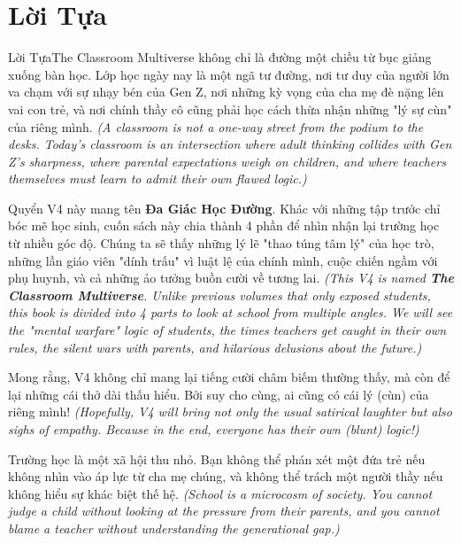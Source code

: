 \chapter*{Lời Tựa}

\begin{truyen}{Lời Tựa}{The Classroom Multiverse}
 không chỉ là đường một chiều từ bục giảng xuống bàn học. Lớp học ngày nay là một ngã tư đường, nơi tư duy của người lớn va chạm với sự nhạy bén của Gen Z, nơi những kỳ vọng của cha mẹ đè nặng lên vai con trẻ, và nơi chính thầy cô cũng phải học cách thừa nhận những "lý sự cùn" của riêng mình. 
\textit{(A classroom is not a one-way street from the podium to the desks. Today's classroom is an intersection where adult thinking collides with Gen Z's sharpness, where parental expectations weigh on children, and where teachers themselves must learn to admit their own flawed logic.)}

Quyển V4 này mang tên \textbf{Đa Giác Học Đường}. Khác với những tập trước chỉ bóc mẽ học sinh, cuốn sách này chia thành 4 phần để nhìn nhận lại trường học từ nhiều góc độ. Chúng ta sẽ thấy những lý lẽ "thao túng tâm lý" của học trò, những lần giáo viên "dính trấu" vì luật lệ của chính mình, cuộc chiến ngầm với phụ huynh, và cả những ảo tưởng buồn cười về tương lai.
\textit{(This V4 is named \textbf{The Classroom Multiverse}. Unlike previous volumes that only exposed students, this book is divided into 4 parts to look at school from multiple angles. We will see the "mental warfare" logic of students, the times teachers get caught in their own rules, the silent wars with parents, and hilarious delusions about the future.)}

Mong rằng, V4 không chỉ mang lại tiếng cười châm biếm thường thấy, mà còn để lại những cái thở dài thấu hiểu. Bởi suy cho cùng, ai cũng có cái lý (cùn) của riêng mình!
\textit{(Hopefully, V4 will bring not only the usual satirical laughter but also sighs of empathy. Because in the end, everyone has their own (blunt) logic!)}
\end{truyen}

\begin{baihoc}
Trường học là một xã hội thu nhỏ. Bạn không thể phán xét một đứa trẻ nếu không nhìn vào áp lực từ cha mẹ chúng, và không thể trách một người thầy nếu không hiểu sự khác biệt thế hệ.
\textit{(School is a microcosm of society. You cannot judge a child without looking at the pressure from their parents, and you cannot blame a teacher without understanding the generational gap.)}
\end{baihoc}

